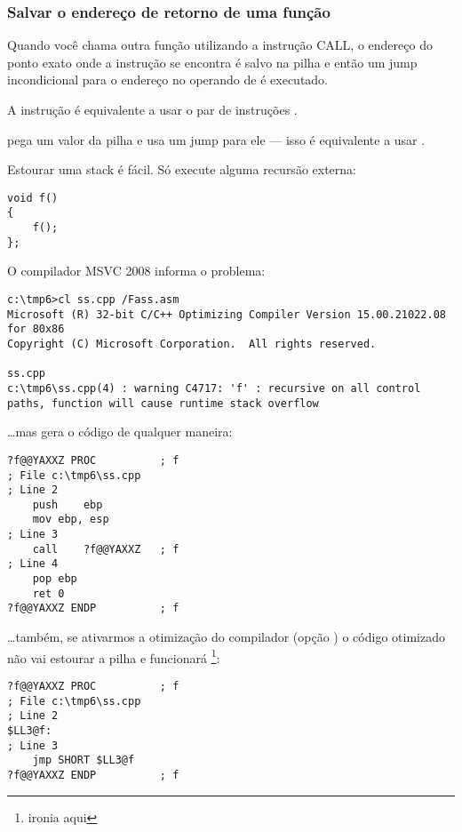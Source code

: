 \subsubsection{Salvar o endereço de retorno de uma função}


Quando você chama outra função utilizando a instrução CALL, o endereço do ponto exato onde a 
instrução \CALL se encontra é salvo na pilha e então um jump incondicional para o endereço no operando de \CALL é executado.

A instrução \CALL é equivalente a usar o par de instruções .

\RET pega um valor da pilha e usa um jump para ele --- isso é equivalente a usar .

\myindex{\Recursion}
Estourar uma stack é fácil. Só execute alguma recursão externa:

\begin{lstlisting}[style=customc]
void f()
{
	f();
};
\end{lstlisting}

O compilador MSVC 2008 informa o problema:

\begin{lstlisting}
c:\tmp6>cl ss.cpp /Fass.asm
Microsoft (R) 32-bit C/C++ Optimizing Compiler Version 15.00.21022.08 for 80x86
Copyright (C) Microsoft Corporation.  All rights reserved.

ss.cpp
c:\tmp6\ss.cpp(4) : warning C4717: 'f' : recursive on all control paths, function will cause runtime stack overflow
\end{lstlisting}

\dots mas gera o código de qualquer maneira:

\begin{lstlisting}[style=customasmx86]
?f@@YAXXZ PROC			; f
; File c:\tmp6\ss.cpp
; Line 2
	push	ebp
	mov	ebp, esp
; Line 3
	call	?f@@YAXXZ	; f
; Line 4
	pop	ebp
	ret	0
?f@@YAXXZ ENDP			; f
\end{lstlisting}

\dots também, se ativarmos a otimização do compilador (opção ) 
o código otimizado não vai estourar a pilha e funcionará  \footnote{ironia aqui}:

\begin{lstlisting}[style=customasmx86]
?f@@YAXXZ PROC			; f
; File c:\tmp6\ss.cpp
; Line 2
$LL3@f:
; Line 3
	jmp	SHORT $LL3@f
?f@@YAXXZ ENDP			; f
\end{lstlisting}

\PTBRph{}

